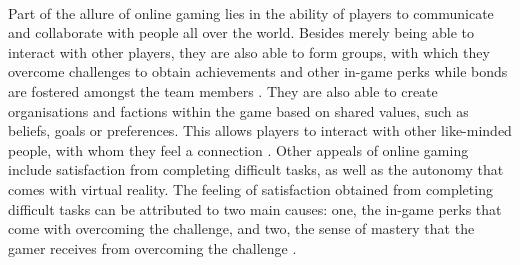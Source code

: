     \paragraph{}
      Part of the allure of online gaming lies in the ability of players to communicate and collaborate with people all over the world. Besides merely being able to interact with other players, they are also able to form groups, with which they overcome challenges to obtain achievements and other in-game perks while bonds are fostered amongst the team members \cite{johnson2015all}. They are also able to create organisations and factions within the game based on shared values, such as beliefs, goals or preferences. This allows players to interact with other like-minded people, with whom they feel a connection \cite{lo2005physical}. Other appeals of online gaming include satisfaction from completing difficult tasks, as well as the autonomy that comes with virtual reality. The feeling of satisfaction obtained from completing difficult tasks can be attributed to two main causes: one, the in-game perks that come with overcoming the challenge, and two, the sense of mastery that the gamer receives from overcoming the challenge \cite{johnson2015all}.
